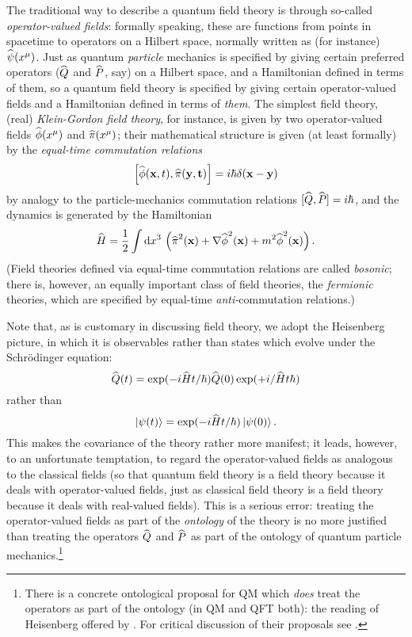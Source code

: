 \documentclass[12pt]{article}
\newcommand{\be}{\begin{equation}}
\newcommand{\ee}{\end{equation}}
\newcommand{\vctr}[1]{\ensuremath{\mathbf{ #1 }}}
\newcommand{\dr}[1]{\ensuremath{\mathrm{d} #1\,}}
\newcommand{\ket}[1]{\ensuremath{\left|  #1 \right\rangle}}
\newcommand{\op}[1]{\ensuremath{\widehat{\textsf{\ensuremath{#1}}}}}
\newcommand{\comm}[2]{\ensuremath{\left[ #1 , #2 \right]}}
\begin{document}
The traditional way to describe a quantum field theory is through so-called \emph{operator-valued fields}: formally speaking, these are functions from points in spacetime to operators on a Hilbert space, normally written as (for instance) $\op{\psi}(x^\mu)$. Just as quantum \emph{particle} mechanics is specified by giving certain preferred operators (\op{Q} and \op{P}, say) on a Hilbert space, and a Hamiltonian defined in terms of them, so a quantum field theory is specified by giving certain operator-valued fields and a Hamiltonian defined in terms of \emph{them}. The simplest field theory, (real) \emph{Klein-Gordon field theory}, for instance, is given by two operator-valued fields $\op{\phi}(x^\mu)$ and $\op{\pi}(x^\mu)$; their mathematical structure is given (at least formally) by the \emph{equal-time commutation relations}
\be
\comm{\op{\phi}(\vctr{x},t)}{\op{\pi}(\vctr{y,t})}= i \hbar \delta(\vctr{x}-\vctr{y})
\ee
by analogy to the particle-mechanics commutation relations $[\op{Q},\op{P}]=i\hbar$, and the dynamics is generated by the Hamiltonian 
\be\label{DMWWKGhamil}
\op{H}=\frac{1}{2}\int \dr{x^3}\left(\op{\pi}^2(\vctr{x})+\nabla \op{\phi}^2(\vctr{x})+m^2 \op{\phi}^2(\vctr{x})\right).
\ee
(Field theories defined via equal-time commutation relations are called \emph{bosonic}; there is, however, an equally important class of field theories, the \emph{fermionic} theories, which are specified by equal-time \emph{anti-}commutation relations.)

Note that, as is customary in discussing field theory, we adopt the Heisenberg picture, in which it is observables rather than states which evolve under the Schr\"{o}dinger equation:
\be
\op{Q}(t)=\exp(-i   \op{H}t/\hbar)\op{Q}(0)\exp(+i/\op{H}t\hbar)
\ee
rather than
\be
\ket{\psi(t)}=\exp(-i  \op{H}t/\hbar )\ket{\psi(0)}.
\ee
This makes the covariance of the theory rather more manifest; it leads, however, to an unfortunate temptation, to regard the operator-valued fields as analogous to the classical fields (so that quantum field theory is a field theory because it deals with operator-valued fields, just as classical field theory is a field theory because it deals with real-valued fields). This is a serious error: treating the operator-valued fields as part of the \emph{ontology} of the theory is no more justified than treating the operators \op{Q} and \op{P} as part of the ontology of quantum particle mechanics.\footnote{There is a concrete ontological proposal for QM which \emph{does} treat the operators as part of the ontology (in QM and QFT both): the reading of Heisenberg offered by . For critical discussion of their proposals see .}
\end{document}
